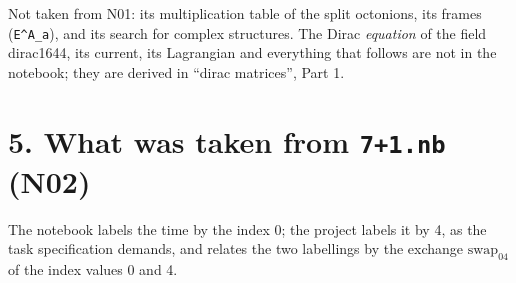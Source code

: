 \documentclass[
  10pt,
]{article}
\begin{document}
Not taken from N01: its multiplication table of the split octonions, its
frames (\texttt{E\^{}A\_a}), and its search for complex structures. The
Dirac \emph{equation} of the field dirac1644, its current, its
Lagrangian and everything that follows are not in the notebook; they are
derived in ``dirac matrices'', Part 1.

\hypertarget{what-was-taken-from-71.nb-n02}{%
\section{\texorpdfstring{5. What was taken from \texttt{7+1.nb}
(N02)}{5. What was taken from 7+1.nb (N02)}}\label{what-was-taken-from-71.nb-n02}}

The notebook labels the time by the index 0; the project labels it by 4,
as the task specification demands, and relates the two labellings by the
exchange \(\mathrm{swap}_{04}\) of the index values 0 and 4.
\end{document}
